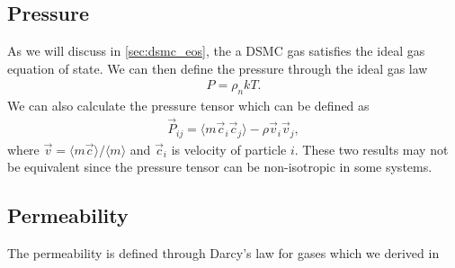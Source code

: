 \subsection{Pressure}
As we will discuss in \ref{sec:dsmc_eos}, the a DSMC gas satisfies the ideal gas equation of state. We can then define the pressure through the ideal gas law
\begin{align}
	P = \rho_n kT.
\end{align}
We can also calculate the pressure tensor which can be defined as \cite{uribe1999burnett}
\begin{align}
	\vec P_{ij} = \langle m\vec c_i \vec c_j \rangle - \rho \vec v_i \vec v_j,
\end{align}
where $\vec v = \langle m\vec c\rangle/\langle m \rangle$ and $\vec c_i$ is velocity of particle $i$. These two results may not be equivalent since the pressure tensor can be non-isotropic in some systems\cite{uribe1999burnett}. 
\subsection{Permeability}
The permeability is defined through Darcy's law for gases which we derived in 